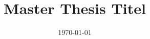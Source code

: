 \titlehead{{\Large Hochschule für Technik Stuttgart 
	\hfill WS~2013/2014\\} 
		Fakultät Vermessung, Mathematik, Informatik\\ 
		Schellingstraße 24\\ 
		70174 Stuttgart} 
\subject{B.Sc. Martin Hans} 
\title{Master Thesis Titel}

\date{\today} 
\publishers{\textbf{Supervisors:} Prof Dr. Marcus Deininger, Dipl. Ing. Tim Dauer} 